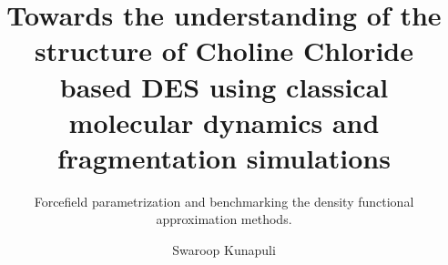 \documentclass{customformat}
\begin{document}
\author{Swaroop Kunapuli}
\title{Towards the understanding of the structure of Choline Chloride based DES using classical molecular dynamics and fragmentation simulations}
\subtitle{Forcefield parametrization and benchmarking the density functional approximation methods.}

\maketitle
\newpage
\tableofcontents
\newpage





\end{document}
